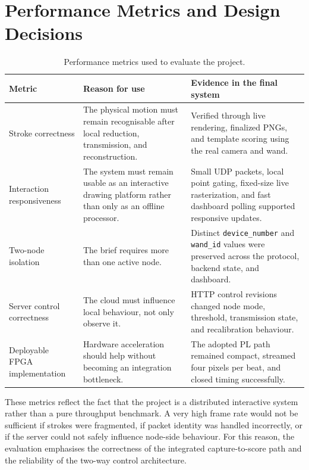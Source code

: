 \documentclass[10pt,a4paper]{article}
\begin{document}
\section{Performance Metrics and Design Decisions}

\begin{table}[t]
\centering
\footnotesize
\begin{tabularx}{\linewidth}{>{\raggedright\arraybackslash}p{2.8cm} >{\raggedright\arraybackslash}p{3.7cm} X}
\toprule
\textbf{Metric} & \textbf{Reason for use} & \textbf{Evidence in the final system} \\
\midrule
Stroke correctness & The physical motion must remain recognisable after local reduction, transmission, and reconstruction. & Verified through live rendering, finalized PNGs, and template scoring using the real camera and wand. \\
Interaction responsiveness & The system must remain usable as an interactive drawing platform rather than only as an offline processor. & Small UDP packets, local point gating, fixed-size live rasterization, and fast dashboard polling supported responsive updates. \\
Two-node isolation & The brief requires more than one active node. & Distinct \texttt{device\_number} and \texttt{wand\_id} values were preserved across the protocol, backend state, and dashboard. \\
Server control correctness & The cloud must influence local behaviour, not only observe it. & HTTP control revisions changed node mode, threshold, transmission state, and recalibration behaviour. \\
Deployable FPGA implementation & Hardware acceleration should help without becoming an integration bottleneck. & The adopted PL path remained compact, streamed four pixels per beat, and closed timing successfully. \\
\bottomrule
\end{tabularx}
\caption{Performance metrics used to evaluate the project.}
\label{tab:metrics}
\end{table}

These metrics reflect the fact that the project is a distributed interactive
system rather than a pure throughput benchmark. A very high frame rate would
not be sufficient if strokes were fragmented, if packet identity was handled
incorrectly, or if the server could not safely influence node-side behaviour.
For this reason, the evaluation emphasises the correctness of the integrated
capture-to-score path and the reliability of the two-way control architecture.
\end{document}
